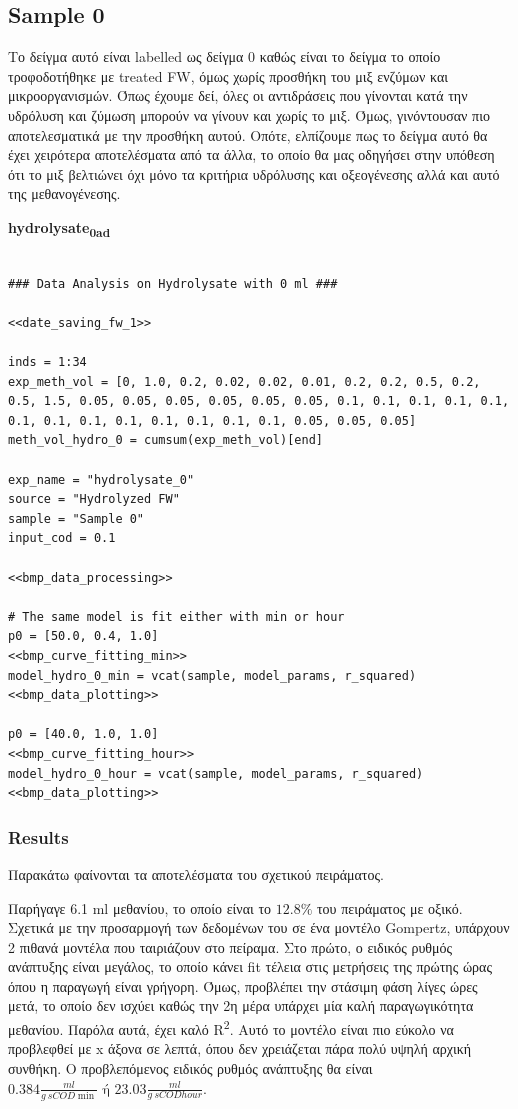 \documentclass[11pt]{article}
\begin{document}
\subsection{Sample 0}
\label{sec:orgd82ab26}
Το δείγμα αυτό είναι labelled ως δείγμα 0 καθώς είναι το δείγμα το οποίο τροφοδοτήθηκε με treated FW, όμως χωρίς προσθήκη του μιξ ενζύμων και μικροοργανισμών. Όπως έχουμε δεί, όλες οι αντιδράσεις που γίνονται κατά την υδρόλυση και ζύμωση μπορούν να γίνουν και χωρίς το μιξ. Όμως, γινόντουσαν πιο αποτελεσματικά με την προσθήκη αυτού. Οπότε, ελπίζουμε πως το δείγμα αυτό θα έχει χειρότερα αποτελέσματα από τα άλλα, το οποίο θα μας οδηγήσει στην υπόθεση ότι το μιξ βελτιώνει όχι μόνο τα κριτήρια υδρόλυσης και οξεογένεσης αλλά και αυτό της μεθανογένεσης.

\textbf{hydrolysate\textsubscript{0}\textsubscript{ad}}
\begin{verbatim}

### Data Analysis on Hydrolysate with 0 ml ###

<<date_saving_fw_1>>

inds = 1:34
exp_meth_vol = [0, 1.0, 0.2, 0.02, 0.02, 0.01, 0.2, 0.2, 0.5, 0.2, 0.5, 1.5, 0.05, 0.05, 0.05, 0.05, 0.05, 0.05, 0.1, 0.1, 0.1, 0.1, 0.1, 0.1, 0.1, 0.1, 0.1, 0.1, 0.1, 0.1, 0.1, 0.05, 0.05, 0.05]
meth_vol_hydro_0 = cumsum(exp_meth_vol)[end]

exp_name = "hydrolysate_0"
source = "Hydrolyzed FW"
sample = "Sample 0"
input_cod = 0.1

<<bmp_data_processing>>

# The same model is fit either with min or hour
p0 = [50.0, 0.4, 1.0]
<<bmp_curve_fitting_min>>
model_hydro_0_min = vcat(sample, model_params, r_squared)
<<bmp_data_plotting>>

p0 = [40.0, 1.0, 1.0]
<<bmp_curve_fitting_hour>>
model_hydro_0_hour = vcat(sample, model_params, r_squared)
<<bmp_data_plotting>>
\end{verbatim}

\subsubsection{Results}
\label{sec:orgd73d461}
Παρακάτω φαίνονται τα αποτελέσματα του σχετικού πειράματος.

Παρήγαγε 6.1 ml μεθανίου, το οποίο είναι το \(12.8 \%\) του πειράματος με οξικό. Σχετικά με την προσαρμογή των δεδομένων του σε ένα μοντέλο Gompertz, υπάρχουν 2 πιθανά μοντέλα που ταιριάζουν στο πείραμα. Στο πρώτο, ο ειδικός ρυθμός ανάπτυξης είναι μεγάλος, το οποίο κάνει fit τέλεια στις μετρήσεις της πρώτης ώρας όπου η παραγωγή είναι γρήγορη. Όμως, προβλέπει την στάσιμη φάση λίγες ώρες μετά, το οποίο δεν ισχύει καθώς την 2η μέρα υπάρχει μία καλή παραγωγικότητα μεθανίου. Παρόλα αυτά, έχει καλό R\textsuperscript{2}. Αυτό το μοντέλο είναι πιο εύκολο να προβλεφθεί με x άξονα σε λεπτά, όπου δεν χρειάζεται πάρα πολύ υψηλή αρχική συνθήκη. Ο προβλεπόμενος ειδικός ρυθμός ανάπτυξης θα είναι \(0.384 \frac{ml}{g ~ sCOD \min } \text{ ή } 23.03 \frac{ml}{g ~ sCOD hour}\).
\end{document}
